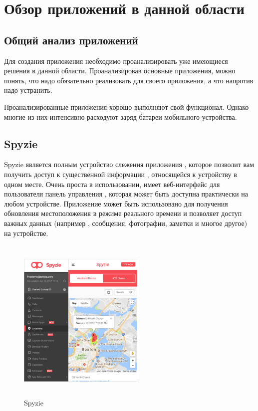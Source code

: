 \documentclass[a4paper,12pt]{article}
\begin{document}

\pagebreak


\section{Обзор приложений в данной области}
\subsection{Общий анализ приложений}
Для создания приложения необходимо проанализировать уже имеющиеся решения
в данной области. Проанализировав основные приложения, можно понять, что
надо обязательно реализовать для своего приложения, а что напротив надо
устранить.

Проанализированные приложения хорошо выполняют свой функционал. Однако многие
из них интенсивно расходуют заряд батареи мобильного устройства.
\subsection{Spyzie}

Spyzie является полным устройство слежения приложения ,
 которое позволит вам получить доступ к существенной информации , 
 относящейся к устройству в одном месте. Очень проста в использовании, 
 имеет веб-интерфейс для пользователя панель управления , которая может быть 
 доступна практически на любом устройстве. Приложение может быть использовано для 
 получения обновления местоположения в режиме реального времени и 
 позволяет доступ важных данных (например , сообщения, фотографии, заметки и многое другое) на устройстве\cite{review5}.
 \begin{figure}[H]
 	\centering
 	\includegraphics[width=6cm,height=8cm]{images/spy-location.jpg}
 	\caption{Spyzie}
 	\label{fig:card}
 \end{figure}
\end{document}
